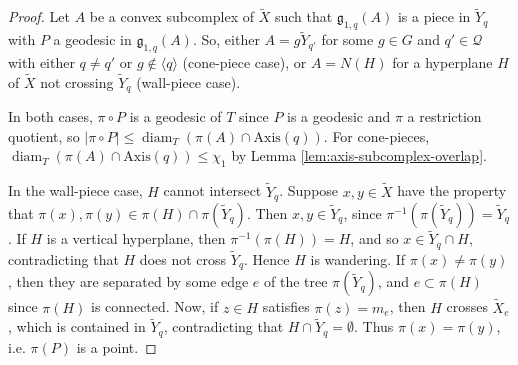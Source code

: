 \documentclass[11pt,oneside]{amsart}
\newcounter{ax}
\theoremstyle{definition}
\DeclareMathOperator{\diam}{diam}
\newcommand{\gate}{\mathfrak g}
\newcommand{\axis}{\mathrm{Axis}}
\begin{document}
\begin{proof}
Let $A$ be a convex subcomplex of $\widetilde X$ such that $\gate_{1,q}(A)$ is a piece in $\widetilde Y_q$ with $P$ a geodesic in $\gate_{1,q}(A)$.  So, either $A=g\widetilde Y_{q'}$ for some $g\in G$ and $q'\in\mathcal Q$ with either $q\neq q'$ or $g\not\in\langle q\rangle$ (cone-piece case), or $A=N(H)$ for a hyperplane $H$ of $\widetilde X$ not crossing $\widetilde Y_q$ (wall-piece case).

In both cases, $\pi\circ P$ is a geodesic of $T$ since $P$ is a geodesic and $\pi$ a restriction quotient, so $|\pi\circ P|\leq \diam_T(\pi(A)\cap \axis(q))$.  For cone-pieces, $\diam_T(\pi(A)\cap \axis(q))\leq \chi_1$ by Lemma \ref{lem:axis-subcomplex-overlap}.

In the wall-piece case, $H$ cannot intersect $\widetilde Y_q$.  Suppose $x,y\in\widetilde X$ have the property that $\pi(x),\pi(y)\in\pi(H)\cap \pi(\widetilde Y_q)$.  Then $x,y\in \widetilde Y_q$, since $\pi^{-1}(\pi(\widetilde Y_q))=\widetilde Y_q$.  If $H$ is a vertical hyperplane, then $\pi^{-1}(\pi(H))=H$, and so $x\in\widetilde Y_q\cap H$, contradicting that $H$ does not cross $\widetilde Y_q$.  Hence $H$ is wandering.  If $\pi(x)\neq \pi(y)$, then they are separated by some edge $e$ of the tree $\pi(\widetilde Y_q)$, and $e\subset \pi(H)$ since $\pi(H)$ is connected.  Now, if $z\in H$ satisfies $\pi(z)=m_e$, then $H$ crosses $\widetilde X_e$, which is contained in $\widetilde Y_q$,  contradicting that $H\cap \widetilde Y_q=\emptyset$.  Thus $\pi(x)=\pi(y)$, i.e. $\pi(P)$ is a point.
\end{proof}
\end{document}
